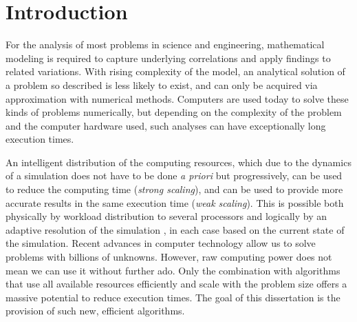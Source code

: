 \chapter{Introduction}
\label{ch:introduction}
\glsresetall

%  


For the analysis of most problems in science and engineering, mathematical modeling is required to capture underlying correlations and apply findings to related variations. With rising complexity of the model, an analytical solution of a problem so described is less likely to exist, and can only be acquired via approximation with numerical methods. Computers are used today to solve these kinds of problems numerically, but depending on the complexity of the problem and the computer hardware used, such analyses can have exceptionally long execution times.

An intelligent distribution of the computing resources, which due to the dynamics of a simulation does not have to be done \textit{a priori} but progressively, can be used to reduce the computing time (\textit{strong scaling}), and can be used to provide more accurate results in the same execution time (\textit{weak scaling}). This is possible both physically by workload distribution to several processors
and logically by
an adaptive resolution of the simulation%
, in each case based on the current state of the simulation.
Recent advances in computer technology allow us to solve problems with billions of unknowns. However, raw computing power does not mean we can use it without further ado. Only the combination with algorithms that use all available resources efficiently and scale with the problem size offers a massive potential to reduce execution times.
The goal of this dissertation is the provision of such new, efficient algorithms.

